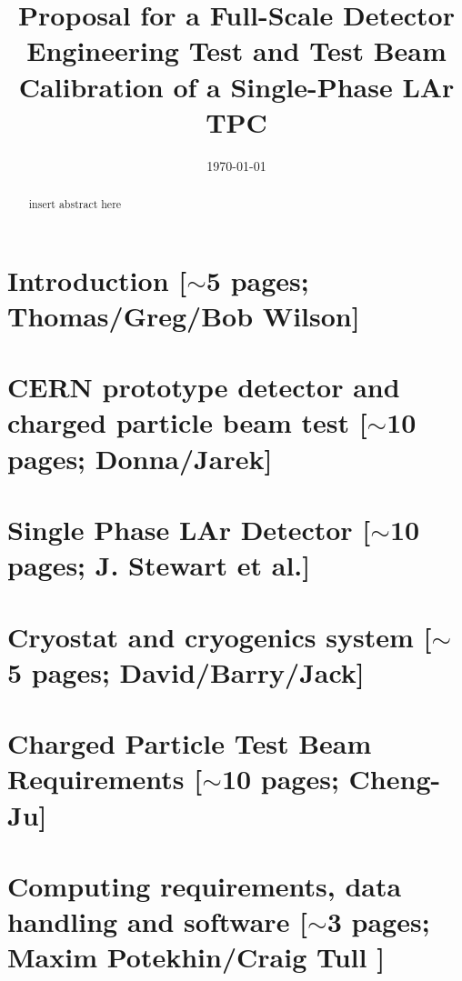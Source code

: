 \documentclass[12pt]{article}
\begin{document}
\title{  Proposal for a Full-Scale Detector Engineering Test and Test Beam Calibration of a Single-Phase LAr TPC}


\date{\today}
	

\maketitle



\begin{abstract}

insert abstract here

\end{abstract}

\newpage
\tableofcontents

\newpage

\section{Introduction [$\sim$5 pages; {\color{red} Thomas/Greg/Bob Wilson}]}
	

\section{CERN prototype detector and charged particle beam test [$\sim$10 pages; {\color{red} Donna/Jarek}]}
	
	

\section{Single Phase LAr Detector [$\sim$10 pages; {\color{red} J. Stewart et al.}]}
	


\section{Cryostat and cryogenics system [$\sim$5 pages; {\color{red} David/Barry/Jack}]}
	


\section{Charged Particle Test Beam Requirements [$\sim$10 pages; {\color{red} Cheng-Ju}]}
	


\section{Computing requirements, data handling and software  [$\sim$3 pages; {\color{red} Maxim Potekhin/Craig Tull }]}
	
\end{document}
